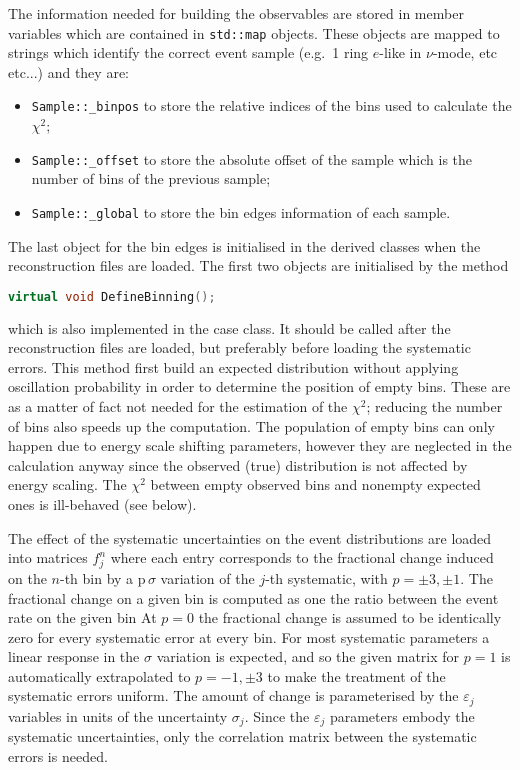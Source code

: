\documentclass[a4paper, 11pt]{article}
\begin{document}
The information needed for building the observables are stored in member variables which are contained in \texttt{std::map} objects.
These objects are mapped to strings which identify the correct event sample (e.g.\ 1 ring $e$-like in $\nu$-mode, etc etc...) and they are:
\begin{itemize}
	\item \texttt{Sample::\_binpos} to store the relative indices of the bins used to calculate the $\chi^2$;
	\item \texttt{Sample::\_offset} to store the absolute offset of the sample which is the number of bins of the previous sample;
	\item \texttt{Sample::\_global} to store the bin edges information of each sample.
\end{itemize}
The last object for the bin edges is initialised in the derived classes when the reconstruction files are loaded.
The first two objects are initialised by the method
\begin{lstlisting}[language=C++]
    virtual void DefineBinning();
\end{lstlisting}
which is also implemented in the case class.
It should be called after the reconstruction files are loaded, but preferably before loading the systematic errors.
This method first build an expected distribution without applying oscillation probability in order to determine the position of empty bins.
These are as a matter of fact not needed for the estimation of the $\chi^2$; reducing the number of bins also speeds up the computation.
The population of empty bins can only happen due to energy scale shifting parameters, however they are neglected in the calculation %
anyway since the observed (true) distribution is not affected by energy scaling.
The $\chi^2$ between empty observed bins and nonempty expected ones is ill-behaved (see below).

The effect of the systematic uncertainties on the event distributions are loaded into matrices $f_j^n$ %
where each entry corresponds to the fractional change induced on the $n$-th bin by a p\,$\sigma$ variation of the $j$-th systematic, %
with $p = \pm3, \pm1$.
The fractional change on a given bin is computed as one the ratio between the event rate on the given bin
At $p=0$ the fractional change is assumed to be identically zero for every systematic error at every bin.
For most systematic parameters a linear response in the $\sigma$ variation is expected, and so %
the given matrix for $p=1$ is automatically extrapolated to $p=-1, \pm3$ to make the treatment of the systematic errors uniform.
The amount of change is parameterised by the $\varepsilon_j$ variables in units of the uncertainty $\sigma_j$.
Since the $\varepsilon_j$ parameters embody the systematic uncertainties, only the correlation matrix between the systematic errors is needed.
\end{document}
